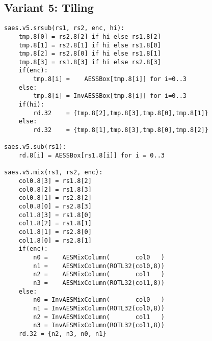 \subsection{Variant 5: Tiling}

\begin{lstlisting}[language=pseudo]
saes.v5.srsub(rs1, rs2, enc, hi):
    tmp.8[0] = rs2.8[2] if hi else rs1.8[2]
    tmp.8[1] = rs2.8[1] if hi else rs1.8[0]
    tmp.8[2] = rs2.8[0] if hi else rs1.8[1]
    tmp.8[3] = rs1.8[3] if hi else rs2.8[3]
    if(enc):
        tmp.8[i] =    AESSBox[tmp.8[i]] for i=0..3
    else:
        tmp.8[i] = InvAESSBox[tmp.8[i]] for i=0..3
    if(hi):
        rd.32    = {tmp.8[2],tmp.8[3],tmp.8[0],tmp.8[1]}
    else:
        rd.32    = {tmp.8[1],tmp.8[3],tmp.8[0],tmp.8[2]}

saes.v5.sub(rs1):
    rd.8[i] = AESSBox[rs1.8[i]] for i = 0..3

saes.v5.mix(rs1, rs2, enc):
    col0.8[3] = rs1.8[2]
    col0.8[2] = rs1.8[3]
    col0.8[1] = rs2.8[2]
    col0.8[0] = rs2.8[3]
    col1.8[3] = rs1.8[0]
    col1.8[2] = rs1.8[1]
    col1.8[1] = rs2.8[0]
    col1.8[0] = rs2.8[1]
    if(enc):
        n0 =    AESMixColumn(       col0   )
        n1 =    AESMixColumn(ROTL32(col0,8))
        n2 =    AESMixColumn(       col1   )
        n3 =    AESMixColumn(ROTL32(col1,8))
    else:
        n0 = InvAESMixColumn(       col0   )
        n1 = InvAESMixColumn(ROTL32(col0,8))
        n2 = InvAESMixColumn(       col1   )
        n3 = InvAESMixColumn(ROTL32(col1,8))
    rd.32 = {n2, n3, n0, n1}
\end{lstlisting}
